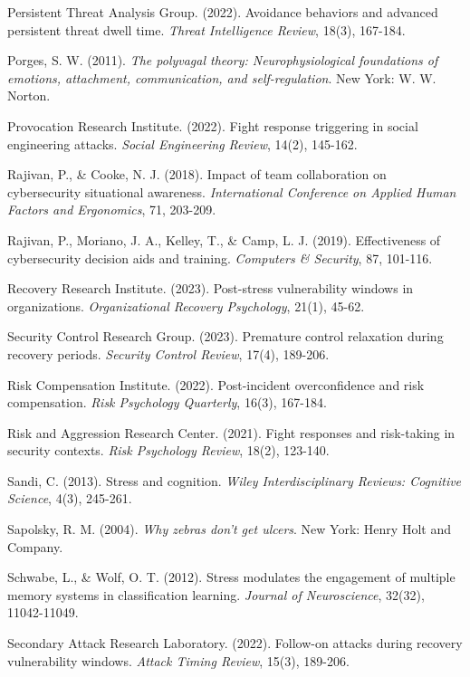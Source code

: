\documentclass[11pt,a4paper]{article}
\begin{document}
\begin{thebibliography}{99}
Persistent Threat Analysis Group. (2022). Avoidance behaviors and advanced persistent threat dwell time. \textit{Threat Intelligence Review}, 18(3), 167-184.

Porges, S. W. (2011). \textit{The polyvagal theory: Neurophysiological foundations of emotions, attachment, communication, and self-regulation}. New York: W. W. Norton.

Provocation Research Institute. (2022). Fight response triggering in social engineering attacks. \textit{Social Engineering Review}, 14(2), 145-162.

Rajivan, P., \& Cooke, N. J. (2018). Impact of team collaboration on cybersecurity situational awareness. \textit{International Conference on Applied Human Factors and Ergonomics}, 71, 203-209.

Rajivan, P., Moriano, J. A., Kelley, T., \& Camp, L. J. (2019). Effectiveness of cybersecurity decision aids and training. \textit{Computers \& Security}, 87, 101-116.

Recovery Research Institute. (2023). Post-stress vulnerability windows in organizations. \textit{Organizational Recovery Psychology}, 21(1), 45-62.

Security Control Research Group. (2023). Premature control relaxation during recovery periods. \textit{Security Control Review}, 17(4), 189-206.

Risk Compensation Institute. (2022). Post-incident overconfidence and risk compensation. \textit{Risk Psychology Quarterly}, 16(3), 167-184.

Risk and Aggression Research Center. (2021). Fight responses and risk-taking in security contexts. \textit{Risk Psychology Review}, 18(2), 123-140.

Sandi, C. (2013). Stress and cognition. \textit{Wiley Interdisciplinary Reviews: Cognitive Science}, 4(3), 245-261.

Sapolsky, R. M. (2004). \textit{Why zebras don't get ulcers}. New York: Henry Holt and Company.

Schwabe, L., \& Wolf, O. T. (2012). Stress modulates the engagement of multiple memory systems in classification learning. \textit{Journal of Neuroscience}, 32(32), 11042-11049.

Secondary Attack Research Laboratory. (2022). Follow-on attacks during recovery vulnerability windows. \textit{Attack Timing Review}, 15(3), 189-206.


\end{thebibliography}
\end{document}
